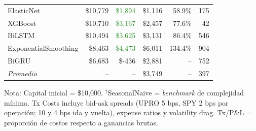 \begin{table}[H]
\begin{tabular}{@{}lrrrrr@{}}
ElasticNet & \$10,779 & \textcolor{ForestGreen}{\$1,894} & \$1,116 & 58.9\% & 175 \\
XGBoost & \$10,710 & \textcolor{ForestGreen}{\$3,167} & \$2,457 & 77.6\% & 42 \\
BiLSTM & \$10,494 & \textcolor{ForestGreen}{\$3,625} & \$3,131 & 86.4\% & 546 \\
ExponentialSmoothing & \$8,463 & \textcolor{ForestGreen}{\$4,473} & \$6,011 & 134.4\% & 904 \\
BiGRU & \$6,683 & \textcolor{BrickRed}{\$-436} & \$2,881 & -- & 752 \\
\midrule
\textit{Promedio} & -- & -- & \$3,749 & -- & 397 \\
\bottomrule
\end{tabular}
\begin{tablenotes}
\small
\item Nota: Capital inicial = \$10,000. \colorbox{naivebg}{$^\dagger$SeasonalNaive} = \textit{benchmark} de complejidad m\'inima. Tx Costs incluye bid-ask spreads (UPRO 5 bps, SPY 2 bps por operaci\'on; 10 y 4 bps ida y vuelta), expense ratios y volatility drag. Tx/P\&L = proporci\'on de costos respecto a ganancias brutas.
\end{tablenotes}
\end{table}
